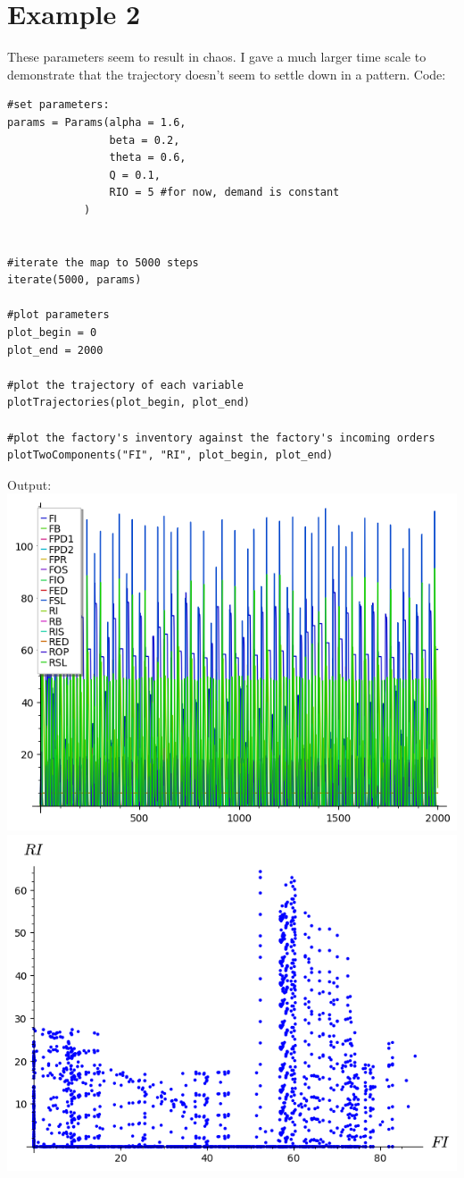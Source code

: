 \documentclass{article}
\begin{document}
\section*{Example 2}
These parameters seem to result in chaos. I gave a much larger time scale to demonstrate that the trajectory doesn't seem to settle down in a pattern.
\linebreak
Code:
\begin{lstlisting}
#set parameters:
params = Params(alpha = 1.6,
				beta = 0.2,
				theta = 0.6,
				Q = 0.1,
				RIO = 5 #for now, demand is constant
			)


#iterate the map to 5000 steps
iterate(5000, params)

#plot parameters
plot_begin = 0
plot_end = 2000

#plot the trajectory of each variable 
plotTrajectories(plot_begin, plot_end)

#plot the factory's inventory against the factory's incoming orders
plotTwoComponents("FI", "RI", plot_begin, plot_end)
\end{lstlisting}
Output:
\linebreak
\includegraphics[scale=1.0]{example2_1.png}
\includegraphics[scale=1.0]{example2_2.png}
\end{document}

